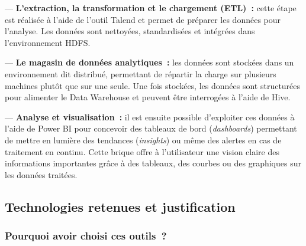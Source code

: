 \vspace{0.2cm}

\noindent — \textbf{L’extraction, la transformation et le chargement (ETL)~:} cette étape est réalisée à l’aide de l’outil Talend et permet de préparer les données pour l’analyse. Les données sont nettoyées, standardisées et intégrées dans l’environnement HDFS.

\vspace{0.2cm}

\noindent — \textbf{Le magasin de données analytiques~:} les données sont stockées dans un environnement dit distribué, permettant de répartir la charge sur plusieurs machines plutôt que sur une seule. Une fois stockées, les données sont structurées pour alimenter le Data Warehouse et peuvent être interrogées à l’aide de Hive.

\vspace{0.2cm}

\noindent — \textbf{Analyse et visualisation~:} il est ensuite possible d'exploiter ces données à l’aide de Power BI pour concevoir des tableaux de bord (\textit{dashboards}) permettant de mettre en lumière des tendances (\textit{insights}) ou même des alertes en cas de traitement en continu. Cette brique offre à l’utilisateur une vision claire des informations importantes grâce à des tableaux, des courbes ou des graphiques sur les données traitées.

\subsection{Technologies retenues et justification}\label{sec:technologies}

\subsubsection*{Pourquoi avoir choisi ces outils~?}

